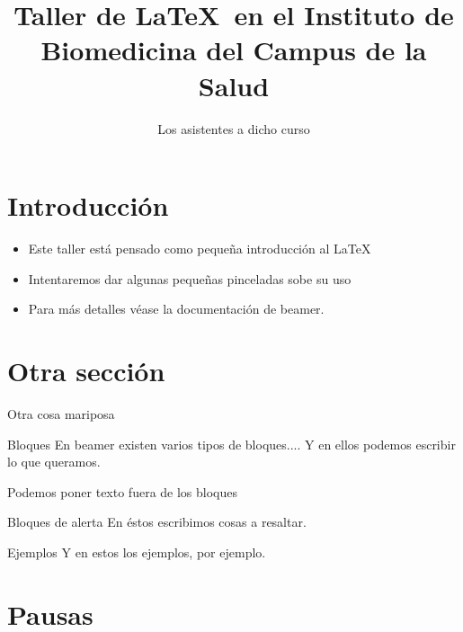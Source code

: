 \documentclass{beamer}
\title[Taller de \LaTeX]{Taller de \LaTeX\ en el Instituto de Biomedicina del Campus de la Salud}
\author[Los presentes]{Los asistentes a dicho curso}
\institute[UGR]{Universidad de Granada}
\begin{document}
\maketitle


\section*{Introducción}

\begin{frame}
\begin{itemize}[<+-|alert@+>]
\item Este taller está pensado como pequeña introducción al \LaTeX 

\item Intentaremos dar algunas pequeñas pinceladas sobe su uso 

\item Para m\'as detalles véase la documentación de beamer.
\end{itemize}
\end{frame}

\section{Otra sección}

\begin{frame}{Otra cosa mariposa}
\begin{block}{Bloques}
En beamer existen varios tipos de bloques....
Y en ellos podemos escribir lo que queramos.
\end{block}

Podemos poner texto fuera de los bloques

\begin{alertblock}{Bloques de alerta}
En éstos escribimos cosas a resaltar.
\end{alertblock}

\begin{exampleblock}{Ejemplos}
Y en estos los ejemplos, por ejemplo.
\end{exampleblock}

\end{frame}

\section{Pausas}
\end{document}
